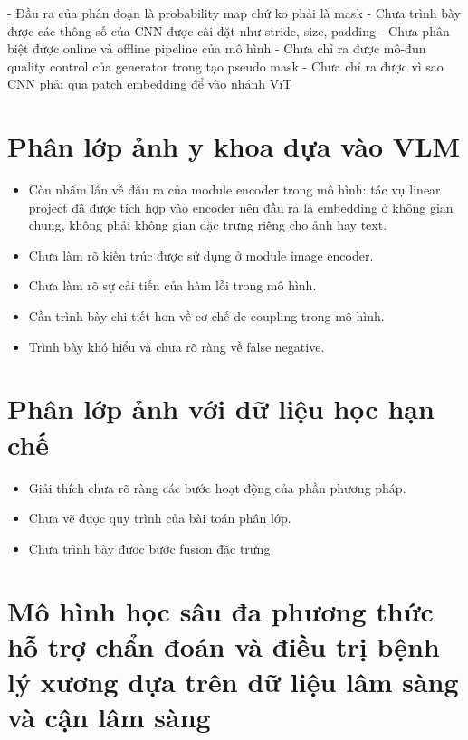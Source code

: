 - Đầu ra của phân đoạn là probability map chứ ko phải là mask
- Chưa trình bày được các thông số của CNN được cài đặt như stride, size, padding
- Chưa phân biệt được online và offline pipeline của mô hình
- Chưa chỉ ra được mô-đun quality control của generator trong tạo pseudo mask
- Chưa chỉ ra được vì sao CNN phải qua patch embedding để vào nhánh ViT

\section*{Phân lớp ảnh y khoa dựa vào VLM}

\begin{itemize}
    \item Còn nhầm lẫn về đầu ra của module encoder trong mô hình: tác vụ linear project đã được tích hợp vào encoder nên đầu ra là embedding ở không gian chung, không phải không gian đặc trưng riêng cho ảnh hay text.

    \item Chưa làm rõ kiến trúc được sử dụng ở module image encoder.

    \item Chưa làm rõ sự cải tiến của hàm lỗi trong mô hình.

    \item Cần trình bày chi tiết hơn về cơ chế de-coupling trong mô hình.

    \item Trình bày khó hiểu và chưa rõ ràng về false negative.
\end{itemize}


\section*{Phân lớp ảnh với dữ liệu học hạn chế}

\begin{itemize}
    \item Giải thích chưa rõ ràng các bước hoạt động của phần phương pháp.

    \item Chưa vẽ được quy trình của bài toán phân lớp.

    \item Chưa trình bày được bước fusion đặc trưng.
\end{itemize}

\section*{Mô hình học sâu đa phương thức hỗ trợ chẩn đoán và điều trị bệnh lý xương dựa trên dữ liệu lâm sàng và cận lâm sàng}

